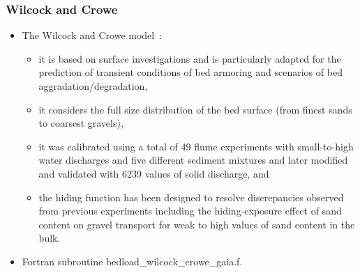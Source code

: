 \subsubsection{Wilcock and Crowe}
\begin{itemize}
\item {}

The Wilcock and Crowe model~\cite{Wilcock2003}:
\begin{itemize}
     \item[{\it i})] it is based on surface investigations and is particularly adapted for the prediction of transient conditions of bed armoring and scenarios of bed aggradation/degradation,
     \item[{\it ii})] it considers the full size distribution of the bed surface (from finest sands to coarsest gravels),
     \item[{\it iii})] it was calibrated using a total of 49 flume experiments with small-to-high water discharges and five different sediment mixtures and later modified and validated with 6239 values of solid discharge, and
     \item[{\it iv})] the hiding function has been designed to resolve discrepancies observed from previous experiments \cite{Proffitt1983,Parker1990} including the hiding-exposure effect of sand content on gravel transport for weak to high values of sand content in the bulk.
\end{itemize}

\item Fortran subroutine {\ttfamily bedload\_wilcock\_crowe\_gaia.f}.
\end{itemize}

